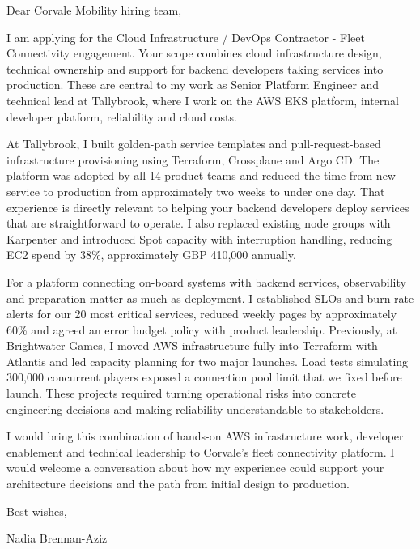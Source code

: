 \documentclass[11pt,a4paper]{article}
\begin{document}
Dear Corvale Mobility hiring team,

I am applying for the Cloud Infrastructure / DevOps Contractor - Fleet Connectivity engagement. Your scope combines cloud infrastructure design, technical ownership and support for backend developers taking services into production. These are central to my work as Senior Platform Engineer and technical lead at Tallybrook, where I work on the AWS EKS platform, internal developer platform, reliability and cloud costs.

At Tallybrook, I built golden-path service templates and pull-request-based infrastructure provisioning using Terraform, Crossplane and Argo CD. The platform was adopted by all 14 product teams and reduced the time from new service to production from approximately two weeks to under one day. That experience is directly relevant to helping your backend developers deploy services that are straightforward to operate. I also replaced existing node groups with Karpenter and introduced Spot capacity with interruption handling, reducing EC2 spend by 38\%, approximately GBP 410,000 annually.

For a platform connecting on-board systems with backend services, observability and preparation matter as much as deployment. I established SLOs and burn-rate alerts for our 20 most critical services, reduced weekly pages by approximately 60\% and agreed an error budget policy with product leadership. Previously, at Brightwater Games, I moved AWS infrastructure fully into Terraform with Atlantis and led capacity planning for two major launches. Load tests simulating 300,000 concurrent players exposed a connection pool limit that we fixed before launch. These projects required turning operational risks into concrete engineering decisions and making reliability understandable to stakeholders.

I would bring this combination of hands-on AWS infrastructure work, developer enablement and technical leadership to Corvale's fleet connectivity platform. I would welcome a conversation about how my experience could support your architecture decisions and the path from initial design to production.

Best wishes,\par
Nadia Brennan-Aziz
\end{document}
